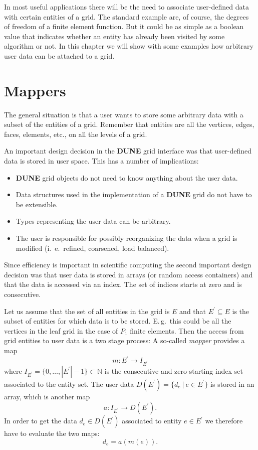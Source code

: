 \documentclass[11pt,a4paper,headinclude,footinclude,DIV16,normalheadings]{scrreprt}
\newcommand{\Dune}{{\sf\bfseries DUNE}\xspace}
\begin{document}
In most useful applications there will be the need to associate
user-defined data with certain entities of a grid. The standard
example are, of course, the degrees of freedom of a finite element
function. But it could be as simple as a boolean value that indicates
whether an entity has already been visited by some algorithm or
not. In this chapter we will show with some examples how arbitrary
user data can be attached to a grid.

\section{Mappers}\label{ch:mappers}

The general situation is that a user wants to store some arbitrary
data with a subset of the entities of a grid. Remember that entities
are all the vertices, edges, faces, elements, etc., on all the levels
of a grid.

An important design decision in the \Dune{} grid interface was that
user-defined data is stored in user space. This has a number of
implications:
\begin{itemize}
\item \Dune{} grid objects do not need to know anything about the user
  data.
\item Data structures used in the implementation of a \Dune{} grid do
  not have to be extensible.
\item Types representing the user data can be arbitrary.
\item The user is responsible for possibly reorganizing the data when
  a grid is modified (i.~e.~refined, coarsened, load balanced).
\end{itemize}

Since efficiency is important in scientific computing the second
important design decision was that user data is stored in arrays (or
random access containers) and that the data is accessed via an
index. The set of indices starts at zero and is consecutive. 

Let us assume that the set of all entities in the grid is $E$ and
that $E^\prime\subseteq E$ is the subset of entities for which data is
to be stored. E.\,g.~this could be all the vertices in the leaf grid in
the case of $P_1$ finite elements. Then the access from grid entities
to user data is a two stage process: A so-called \textit{mapper}
provides a map
\begin{equation}
m : E^\prime \to I_{E^\prime}
\end{equation}
where $I_{E^\prime}=\{0,\ldots,|E^\prime|-1\}\subset\mathbb{N}$ is the consecutive and
zero-starting index set associated to the entity set. The user data
$D(E^\prime)=\{d_e\ |\ e\in E^\prime\}$ is stored in an array, which
is another map
\begin{equation}
a : I_{E^\prime} \to D(E^\prime).
\end{equation}
In order to get the data $d_e\in D(E^\prime)$ associated to entity
$e\in E^\prime$ we therefore have to evaluate the two maps:
\begin{equation}
d_e = a(m(e)) .
\end{equation}
\end{document}
